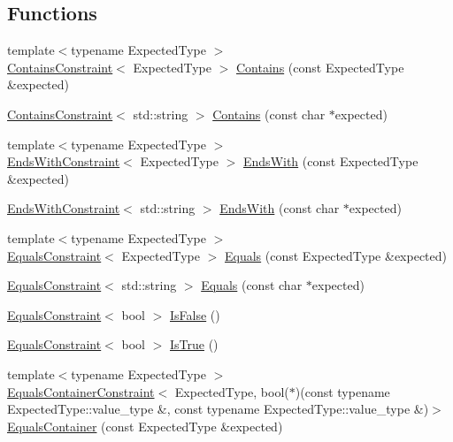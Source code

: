 \subsection*{Functions}
\begin{DoxyCompactItemize}
\item 
{\footnotesize template$<$typename Expected\+Type $>$ }\\\mbox{\hyperlink{structsnowhouse_1_1ContainsConstraint}{Contains\+Constraint}}$<$ Expected\+Type $>$ \mbox{\hyperlink{namespacesnowhouse_ac66321592f0a30a5c82bfc0a6bb9c43e}{Contains}} (const Expected\+Type \&expected)
\item 
\mbox{\hyperlink{structsnowhouse_1_1ContainsConstraint}{Contains\+Constraint}}$<$ std\+::string $>$ \mbox{\hyperlink{namespacesnowhouse_a4e7266e0604ebf2fc23d65e2c913af7e}{Contains}} (const char $\ast$expected)
\item 
{\footnotesize template$<$typename Expected\+Type $>$ }\\\mbox{\hyperlink{structsnowhouse_1_1EndsWithConstraint}{Ends\+With\+Constraint}}$<$ Expected\+Type $>$ \mbox{\hyperlink{namespacesnowhouse_a989264d50c4a959ccdb0041eb51b164a}{Ends\+With}} (const Expected\+Type \&expected)
\item 
\mbox{\hyperlink{structsnowhouse_1_1EndsWithConstraint}{Ends\+With\+Constraint}}$<$ std\+::string $>$ \mbox{\hyperlink{namespacesnowhouse_a94ebdf61c89a001f203c92c8c97391a5}{Ends\+With}} (const char $\ast$expected)
\item 
{\footnotesize template$<$typename Expected\+Type $>$ }\\\mbox{\hyperlink{structsnowhouse_1_1EqualsConstraint}{Equals\+Constraint}}$<$ Expected\+Type $>$ \mbox{\hyperlink{namespacesnowhouse_a39f889099be8440c98dab750540c10c1}{Equals}} (const Expected\+Type \&expected)
\item 
\mbox{\hyperlink{structsnowhouse_1_1EqualsConstraint}{Equals\+Constraint}}$<$ std\+::string $>$ \mbox{\hyperlink{namespacesnowhouse_abb5ff4c2cdc309a57ddf619605956ee9}{Equals}} (const char $\ast$expected)
\item 
\mbox{\hyperlink{structsnowhouse_1_1EqualsConstraint}{Equals\+Constraint}}$<$ bool $>$ \mbox{\hyperlink{namespacesnowhouse_a642a68e71efdb37e77e1eeaa96978b3b}{Is\+False}} ()
\item 
\mbox{\hyperlink{structsnowhouse_1_1EqualsConstraint}{Equals\+Constraint}}$<$ bool $>$ \mbox{\hyperlink{namespacesnowhouse_a5666021c8516bcb9eb9fd8a026e64ab9}{Is\+True}} ()
\item 
{\footnotesize template$<$typename Expected\+Type $>$ }\\\mbox{\hyperlink{structsnowhouse_1_1EqualsContainerConstraint}{Equals\+Container\+Constraint}}$<$ Expected\+Type, bool($\ast$)(const typename Expected\+Type\+::value\+\_\+type \&, const typename Expected\+Type\+::value\+\_\+type \&)$>$ \mbox{\hyperlink{namespacesnowhouse_adcdb60feee213128183265a33b27708c}{Equals\+Container}} (const Expected\+Type \&expected)

\end{DoxyCompactItemize}
